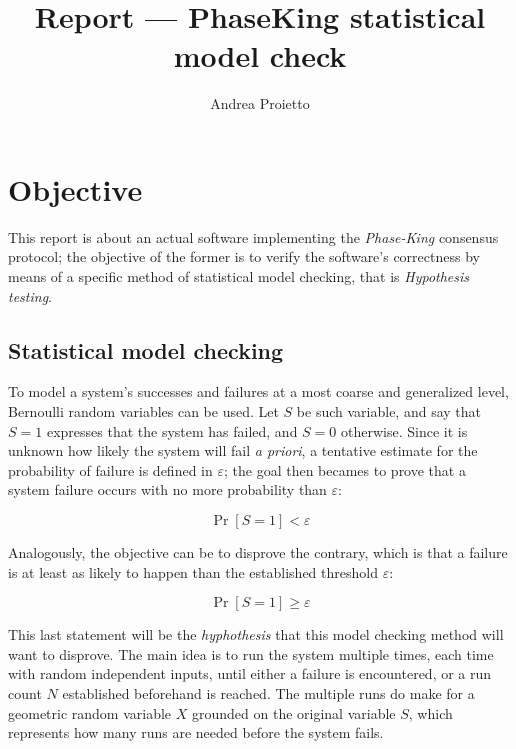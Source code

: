 \documentclass{article}
\title{Report --- PhaseKing statistical model check}
\author{Andrea Proietto}
\begin{document}
    \maketitle


    \section{Objective}

    This report is about an actual software implementing the \emph{Phase-King} consensus protocol; the objective of the former is to verify the software's correctness by means of a specific method of statistical model checking, that is \emph{Hypothesis testing}.

    \subsection{Statistical model checking}

    To model a system's successes and failures at a most coarse and generalized level, Bernoulli random variables can be used. Let $S$ be such variable, and say that $S = 1$ expresses that the system has failed, and $S = 0$ otherwise. Since it is unknown how likely the system will fail \emph{a priori}, a tentative estimate for the probability of failure is defined in $\varepsilon$; the goal then becames to prove that a system failure occurs with no more probability than $\varepsilon$:

    \[
        \Pr[S = 1] < \varepsilon
    \]

    Analogously, the objective can be to disprove the contrary, which is that a failure is at least as likely to happen than the established threshold $\varepsilon$:

    \[
        \Pr[S = 1] \geq \varepsilon
    \]

    This last statement will be the \emph{hyphothesis} that this model checking method will want to disprove. The main idea is to run the system multiple times, each time with random independent inputs, until either a failure is encountered, or a run count $N$ established beforehand is reached. The multiple runs do make for a geometric random variable $X$ grounded on the original variable $S$, which represents how many runs are needed before the system fails.
\end{document}
